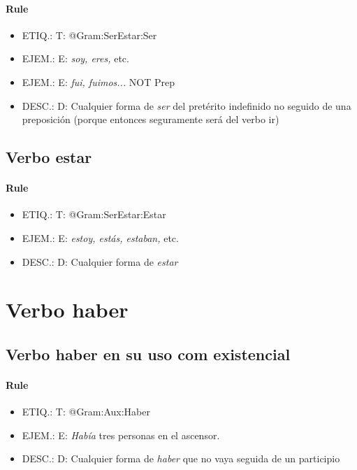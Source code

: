 \documentclass[11pt]{report}
\begin{document}
\paragraph*{Rule}
\begin{itemize}
\item ETIQ.:  T: @Gram:SerEstar:Ser
\item EJEM.:  E: \emph{soy, eres,} etc. 
\item EJEM.:  E: \emph{fui, fuimos...} NOT Prep 
\item DESC.:  D: Cualquier forma de \emph{ser} del pretérito indefinido no seguido de una preposición (porque entonces seguramente será del verbo ir)
\end{itemize}

\subsection{Verbo estar}
\paragraph*{Rule}
\begin{itemize}
\item ETIQ.:  T: @Gram:SerEstar:Estar
\item EJEM.:  E: \emph{estoy, estás, estaban,} etc. 
\item DESC.:  D: Cualquier forma de \emph{estar}
\end{itemize}

\section{Verbo haber}
\subsection{Verbo haber en su uso com existencial}
\paragraph*{Rule}
\begin{itemize}
\item ETIQ.:  T: @Gram:Aux:Haber
\item EJEM.:  E: \emph{Había} tres personas en el ascensor. 
\item DESC.:  D: Cualquier forma de \emph{haber} que no vaya seguida de un participio
\end{itemize}
\end{document}
